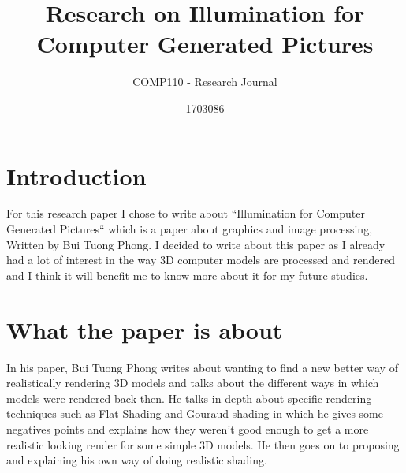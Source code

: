 \documentclass{scrartcl}
\title{Research on Illumination for
Computer Generated
Pictures }
\subtitle{COMP110 - Research Journal}
\author{1703086}
\begin{document}
\maketitle


\section{Introduction}
For this research paper I chose to write about ``Illumination for Computer Generated Pictures`` \cite{one} which is a paper about graphics and image processing, Written by Bui Tuong Phong. I decided to write about this paper as I already had a lot of interest in the way 3D computer models are processed and rendered and I think it will benefit me to know more about it for my future studies. 

\section{What the paper is about}
In his paper, Bui Tuong Phong writes about wanting to find a new better way of realistically rendering 3D models and talks about the different ways in which models were rendered back then. He talks in depth about specific rendering techniques such as Flat Shading and Gouraud shading in which he gives some negatives points and explains how they weren't good enough to get a more realistic looking render for some simple 3D models. He then goes on to proposing and explaining his own way of doing realistic shading.
\end{document}
